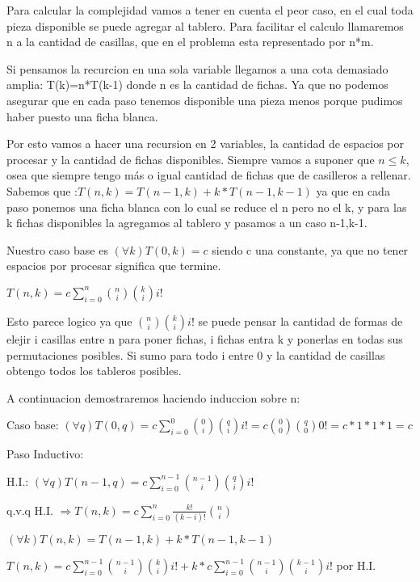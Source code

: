 Para calcular la complejidad vamos a tener en cuenta el peor caso, en el cual toda pieza disponible se puede agregar al tablero. Para facilitar el calculo llamaremos n a la cantidad de casillas, que en el problema esta representado por n*m.

Si pensamos la recurcion en una sola variable llegamos a una cota demasiado amplia:
T(k)=n*T(k-1) donde n es la cantidad de fichas. Ya que no podemos asegurar que en cada paso tenemos disponible una pieza menos porque pudimos haber puesto una ficha blanca.

Por esto vamos a hacer una recursion en 2 variables, la cantidad de espacios por procesar y la cantidad de fichas disponibles. Siempre vamos a suponer que $n\leq k$, osea que siempre tengo más o igual cantidad de fichas que de casilleros a rellenar.
Sabemos que :$T(n,k) = T(n-1,k) + k*T(n-1,k-1)$ ya que en cada paso ponemos una ficha blanca con lo cual se reduce el n pero no el k, y para las k fichas disponibles la agregamos al tablero y pasamos a un caso n-1,k-1.

Nuestro caso base es $(\forall k) T(0,k)= c$ siendo c una constante, ya que no tener espacios por procesar significa que termine.


$T(n,k) = c \sum_{i=0}^{n} \binom{n}{i} \binom{k}{i} i!$

Esto parece logico ya que $\binom{n}{i} \binom{k}{i} i!$ se puede pensar la cantidad de formas de elejir i casillas entre n para poner fichas, i fichas entra k y ponerlas en todas sus permutaciones posibles. Si sumo para todo i entre 0 y la cantidad de casillas obtengo todos los tableros posibles.

A continuacion demostraremos haciendo induccion sobre n:

Caso base: $(\forall q)T(0,q)= c \sum_{i=0}^{0} \binom{0}{i} \binom{q}{i} i! = c \binom{0}{0} \binom{q}{0} 0! = c*1*1*1 = c$

Paso Inductivo:

H.I.: $(\forall q)T(n-1,q) = c \sum_{i=0}^{n-1} \binom{n-1}{i} \binom{q}{i} i!$

q.v.q H.I. $\Rightarrow T(n,k)  = c  \sum_{i=0}^{n} \frac{k!}{(k-i)!}\binom{n}{i}$ 

$(\forall k) T(n,k) = T(n-1,k) + k*T(n-1,k-1)$

$T(n,k) = c \sum_{i=0}^{n-1} \binom{n-1}{i} \binom{k}{i} i! + k * c \sum_{i=0}^{n-1} \binom{n-1}{i} \binom{k-1}{i} i!$ por H.I.

